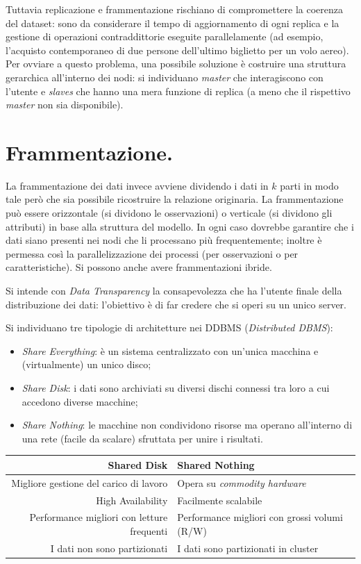 \documentclass[a4page, 11pt]{article}
\begin{document}
Tuttavia replicazione e frammentazione rischiano di compromettere la coerenza del dataset: sono da considerare il tempo di aggiornamento di ogni replica e la gestione di operazioni contraddittorie eseguite parallelamente (ad esempio, l'acquisto contemporaneo di due persone dell'ultimo biglietto per un volo aereo).
Per ovviare a questo problema, una possibile soluzione è costruire una struttura gerarchica all'interno dei nodi: si individuano \textit{master} che interagiscono con l'utente e \textit{slaves} che hanno una mera funzione di replica (a meno che il rispettivo \textit{master} non sia disponibile).

\section{Frammentazione.}
La frammentazione dei dati invece avviene dividendo i dati in $k$ parti in modo tale però che sia possibile ricostruire la relazione originaria.
La frammentazione può essere orizzontale (si dividono le osservazioni) o verticale (si dividono gli attributi) in base alla struttura del modello.
In ogni caso dovrebbe garantire che i dati siano presenti nei nodi che li processano più frequentemente; inoltre è permessa così la parallelizzazione dei processi (per osservazioni o per caratteristiche).
Si possono anche avere frammentazioni ibride.

Si intende con \textit{Data Transparency} la consapevolezza che ha l'utente finale della distribuzione dei dati: l'obiettivo è di far credere che si operi su un unico server. \newline

Si individuano tre tipologie di architetture nei DDBMS (\textit{Distributed DBMS}):
\begin{itemize}
\item \textit{Share Everything}: è un sistema centralizzato con un'unica macchina e (virtualmente) un unico disco;
\item \textit{Share Disk}: i dati sono archiviati su diversi dischi connessi tra loro a cui accedono diverse macchine;
\item \textit{Share Nothing}: le macchine non condividono risorse ma operano all'interno di una rete (facile da scalare) sfruttata per unire i risultati.
\end{itemize}


\begin{center}
  \begin{tabular}{r|l}
    \textbf{Shared Disk} & \textbf{Shared Nothing} \\
    \hline
    Migliore gestione del carico di lavoro & Opera su \textit{commodity hardware}  \\
    High Availability & Facilmente scalabile \\
    Performance migliori con letture frequenti & Performance migliori con grossi volumi (R/W) \\
    I dati non sono partizionati & I dati sono partizionati in cluster
  \end{tabular}
\end{center}
\end{document}
